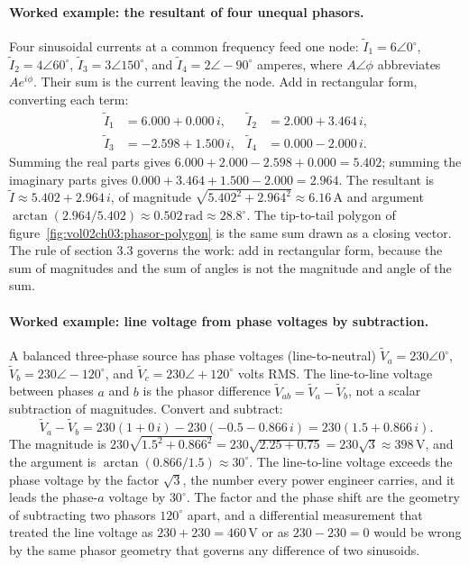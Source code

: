 \paragraph{Worked example: the resultant of four unequal phasors.} Four
sinusoidal currents at a common frequency feed one node:
$\tilde I_{1} = 6\angle 0^{\circ}$, $\tilde I_{2} = 4\angle 60^{\circ}$,
$\tilde I_{3} = 3\angle 150^{\circ}$, and $\tilde I_{4} = 2\angle
-90^{\circ}$ amperes, where $A\angle\phi$ abbreviates $A e^{i\phi}$. Their
sum is the current leaving the node. Add in rectangular form, converting each
term:
\begin{align*}
\tilde I_{1} &= 6.000 + 0.000\,i, &
\tilde I_{2} &= 2.000 + 3.464\,i, \\
\tilde I_{3} &= -2.598 + 1.500\,i, &
\tilde I_{4} &= 0.000 - 2.000\,i.
\end{align*}
Summing the real parts gives $6.000 + 2.000 - 2.598 + 0.000 = 5.402$; summing
the imaginary parts gives $0.000 + 3.464 + 1.500 - 2.000 = 2.964$. The
resultant is $\tilde I \approx 5.402 + 2.964\,i$, of magnitude
$\sqrt{5.402^{2} + 2.964^{2}} \approx 6.16\,\si{\ampere}$ and argument
$\arctan(2.964/5.402) \approx 0.502\,\text{rad} \approx 28.8^{\circ}$. The
tip-to-tail polygon of figure~\ref{fig:vol02ch03:phasor-polygon} is the same
sum drawn as a closing vector. The rule of section 3.3 governs the work: add
in rectangular form, because the sum of magnitudes and the sum of angles is
not the magnitude and angle of the sum.

\paragraph{Worked example: line voltage from phase voltages by subtraction.}
A balanced three-phase source has phase voltages (line-to-neutral)
$\tilde V_{a} = 230\angle 0^{\circ}$, $\tilde V_{b} = 230\angle -120^{\circ}$,
and $\tilde V_{c} = 230\angle +120^{\circ}$ volts RMS. The line-to-line
voltage between phases $a$ and $b$ is the phasor difference $\tilde V_{ab} =
\tilde V_{a} - \tilde V_{b}$, not a scalar subtraction of magnitudes. Convert
and subtract:
\[
\tilde V_{a} - \tilde V_{b}
= 230(1 + 0\,i) - 230(-0.5 - 0.866\,i)
= 230(1.5 + 0.866\,i).
\]
The magnitude is $230\sqrt{1.5^{2} + 0.866^{2}} = 230\sqrt{2.25 + 0.75} =
230\sqrt{3} \approx 398\,\si{\volt}$, and the argument is
$\arctan(0.866/1.5) \approx 30^{\circ}$. The line-to-line voltage exceeds the
phase voltage by the factor $\sqrt{3}$, the number every power engineer
carries, and it leads the phase-$a$ voltage by $30^{\circ}$. The factor and
the phase shift are the geometry of subtracting two phasors $120^{\circ}$
apart, and a differential measurement that treated the line voltage as
$230 + 230 = 460\,\si{\volt}$ or as $230 - 230 = 0$ would be wrong by the
same phasor geometry that governs any difference of two sinusoids.

